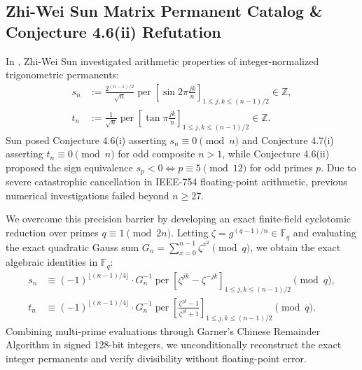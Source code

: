 \documentclass[11pt,a4paper]{article}
\theoremstyle{definition}
\theoremstyle{remark}
\begin{document}
\subsection{Zhi-Wei Sun Matrix Permanent Catalog \& Conjecture 4.6(ii) Refutation}
In \cite{sun2021}, Zhi-Wei Sun investigated arithmetic properties of integer-normalized trigonometric permanents:
\begin{align}
s_n &:= \frac{2^{(n-1)/2}}{\sqrt{n}} \operatorname{per}\left[\sin 2\pi \frac{jk}{n}\right]_{1 \le j, k \le (n-1)/2} \in \mathbb{Z}, \\
t_n &:= \frac{1}{\sqrt{n}} \operatorname{per}\left[\tan \pi \frac{jk}{n}\right]_{1 \le j, k \le (n-1)/2} \in \mathbb{Z}.
\end{align}
Sun posed Conjecture 4.6(i) asserting $s_n \equiv 0 \pmod n$ and Conjecture 4.7(i) asserting $t_n \equiv 0 \pmod n$ for odd composite $n > 1$, while Conjecture 4.6(ii) proposed the sign equivalence $s_p < 0 \iff p \equiv 5 \pmod{12}$ for odd primes $p$. Due to severe catastrophic cancellation in IEEE-754 floating-point arithmetic, previous numerical investigations failed beyond $n \ge 27$.

We overcome this precision barrier by developing an exact finite-field cyclotomic reduction over primes $q \equiv 1 \pmod{2n}$. Letting $\zeta = g^{(q-1)/n} \in \mathbb{F}_q$ and evaluating the exact quadratic Gauss sum $G_n = \sum_{x=0}^{n-1} \zeta^{x^2} \pmod q$, we obtain the exact algebraic identities in $\mathbb{F}_q$:
\begin{align}
s_n &\equiv (-1)^{\lfloor (n-1)/4 \rfloor} \cdot G_n^{-1} \operatorname{per}\left[\zeta^{jk} - \zeta^{-jk}\right]_{1 \le j, k \le (n-1)/2} \pmod q, \\
t_n &\equiv (-1)^{\lfloor (n-1)/4 \rfloor} \cdot G_n^{-1} \operatorname{per}\left[\frac{\zeta^{jk}-1}{\zeta^{jk}+1}\right]_{1 \le j, k \le (n-1)/2} \pmod q.
\end{align}
Combining multi-prime evaluations through Garner's Chinese Remainder Algorithm in signed 128-bit integers, we unconditionally reconstruct the exact integer permanents and verify divisibility without floating-point error.
\end{document}
